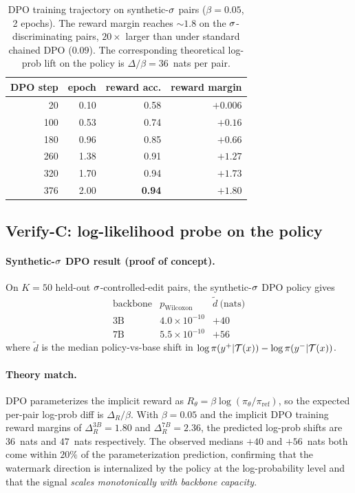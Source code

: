 \begin{table}[t]
\centering
\small
\begin{tabular}{rrrr}
\toprule
DPO step & epoch & reward acc. & reward margin \\
\midrule
20  & 0.10 & 0.58 & $+0.006$ \\
100 & 0.53 & 0.74 & $+0.16$ \\
180 & 0.96 & 0.85 & $+0.66$ \\
260 & 1.38 & 0.91 & $+1.27$ \\
320 & 1.70 & 0.94 & $+1.73$ \\
376 & 2.00 & \textbf{0.94} & $\mathbf{+1.80}$ \\
\bottomrule
\end{tabular}
\caption{DPO training trajectory on synthetic-$\sigma$ pairs ($\beta=0.05$,
2 epochs). The reward margin reaches $\sim 1.8$ on the
$\sigma$-discriminating pairs, $20{\times}$ larger than under standard
chained DPO ($0.09$). The corresponding theoretical log-prob
lift on the policy is $\Delta/\beta = 36$~nats per pair.}
\label{tab:dpo-trajectory}
\end{table}

\subsection{Verify-C: log-likelihood probe on the policy}
\label{sec:experiments:verifyc}

\paragraph{Synthetic-$\sigma$ DPO result (proof of concept).}
On $K{=}50$ held-out $\sigma$-controlled-edit pairs, the
synthetic-$\sigma$ DPO policy gives
\begin{equation*}
\begin{array}{rcc}
\text{backbone} & p_{\text{Wilcoxon}} & \tilde{d}~\text{(nats)} \\\hline
\text{3B} & 4.0\times 10^{-10} & +40 \\
\text{7B} & 5.5\times 10^{-10} & +56
\end{array}
\end{equation*}
where $\tilde{d}$ is the median policy-vs-base shift in
$\log \pi(y^{+}|\mathcal{T}(x)) - \log \pi(y^{-}|\mathcal{T}(x))$.

\paragraph{Theory match.}
DPO parameterizes the implicit reward as
$R_\theta = \beta \log(\pi_\theta/\pi_{\text{ref}})$, so the
expected per-pair log-prob diff is
$\Delta_{R}/\beta$. With $\beta=0.05$ and the implicit DPO
training reward margins of $\Delta_R^{3B}{=}1.80$ and
$\Delta_R^{7B}{=}2.36$, the predicted log-prob shifts are
$36$~nats and $47$~nats respectively. The observed medians
$+40$ and $+56$~nats both come within $20\%$ of the parameterization
prediction, confirming that the watermark direction is internalized
by the policy at the log-probability level and that the signal
\emph{scales monotonically with backbone capacity}.


